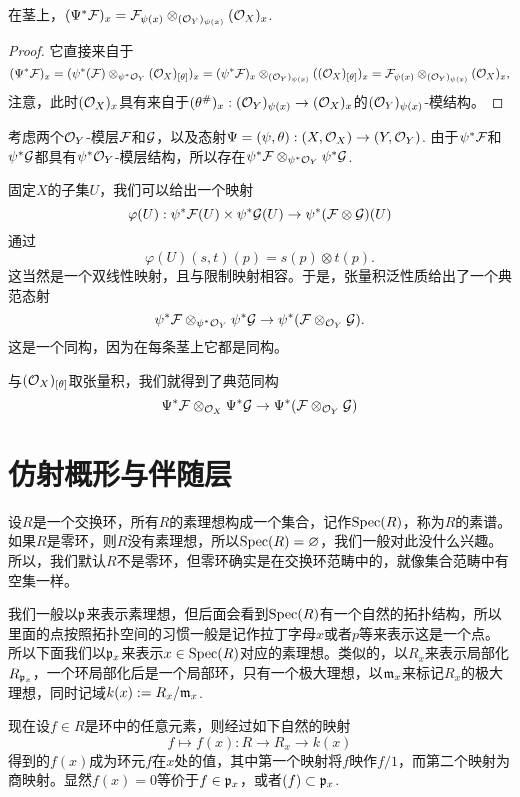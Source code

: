 \begin{pro}
在茎上，$(\Psi^*\mathcal{F})_x=\mathcal{F}_{\psi(x)}\otimes_{(\mathcal{O}_Y)_{\psi(x)}} (\mathcal{O}_X)_{x}$.
\end{pro}

\begin{proof}
它直接来自于
\[
	(\Psi^*\mathcal{F})_x=(\psi^*(\mathcal{F})\otimes_{\psi^*\mathcal{O}_Y} (\mathcal{O}_X)_{[\theta]})_x=(\psi^*\mathcal{F})_x\otimes_{(\mathcal{O}_Y)_{\psi(x)}}((\mathcal{O}_X)_{[\theta]})_x=\mathcal{F}_{\psi(x)}\otimes_{(\mathcal{O}_Y)_{\psi(x)}}(\mathcal{O}_X)_x,
\]
注意，此时$(\mathcal{O}_X)_x$具有来自于$(\theta^\#)_x:(\mathcal{O}_Y)_{\psi(x)}\to (\mathcal{O}_X)_x$的$(\mathcal{O}_Y)_{\psi(x)}$-模结构。
\end{proof}

\begin{para}[张量积的逆像]
考虑两个$\mathcal{O}_Y$-模层$\mathcal{F}$和$\mathcal{G}$，以及态射$\Psi=(\psi,\theta):(X,\mathcal{O}_X)\to (Y,\mathcal{O}_Y)$. 由于$\psi^*\mathcal{F}$和$\psi^*\mathcal{G}$都具有$\psi^*\mathcal{O}_Y$-模层结构，所以存在$\psi^*\mathcal{F}\otimes_{\psi^*\mathcal{O}_Y}\psi^*\mathcal{G}$.

固定$X$的子集$U$，我们可以给出一个映射
\[
	\varphi(U):\psi^*\mathcal{F}(U)\times \psi^*\mathcal{G}(U) \to \psi^*(\mathcal{F}\otimes \mathcal{G})(U)
\]
通过
\[
	\varphi(U)(s,t)(p)=s(p)\otimes t(p).
\]
这当然是一个双线性映射，且与限制映射相容。于是，张量积泛性质给出了一个典范态射
\[
	\psi^*\mathcal{F}\otimes_{\psi^*\mathcal{O}_Y} \psi^*\mathcal{G} \to \psi^*(\mathcal{F}\otimes_{\mathcal{O}_Y} \mathcal{G}).
\]
这是一个同构，因为在每条茎上它都是同构。

与$(\mathcal{O}_X)_{[\theta]}$取张量积，我们就得到了典范同构
\[
	\Psi^*\mathcal{F}\otimes_{\mathcal{O}_X} \Psi^*\mathcal{G} \to \Psi^*(\mathcal{F}\otimes_{\mathcal{O}_Y} \mathcal{G})
\]
\end{para}

\section{仿射概形与伴随层}

\para 设$R$是一个交换环，所有$R$的素理想构成一个集合，记作$\operatorname{Spec}(R)$，称为$R$的素谱。如果$R$是零环，则$R$没有素理想，所以$\operatorname{Spec}(R)=\varnothing$，我们一般对此没什么兴趣。所以，我们默认$R$不是零环，但零环确实是在交换环范畴中的，就像集合范畴中有空集一样。

我们一般以$\mathfrak{p}$来表示素理想，但后面会看到$\operatorname{Spec}(R)$有一个自然的拓扑结构，所以里面的点按照拓扑空间的习惯一般是记作拉丁字母$x$或者$p$等来表示这是一个点。所以下面我们以$\mathfrak{p}_x$来表示$x\in \operatorname{Spec}(R)$对应的素理想。类似的，以$R_x$来表示局部化$R_{\mathfrak{p}_x}$，一个环局部化后是一个局部环，只有一个极大理想，以$\mathfrak{m}_x$来标记$R_x$的极大理想，同时记域$k(x):=R_x/\mathfrak{m}_x$.

\para 现在设$f\in R$是环中的任意元素，则经过如下自然的映射
\[
	f\mapsto f(x):R\to R_x\to k(x)
\]
得到的$f(x)$成为环元$f$在$x$处的值，其中第一个映射将$f$映作$f/1$，而第二个映射为商映射。显然$f(x)=0$等价于$f\in \mathfrak{p}_x$，或者$(f)\subset \mathfrak{p}_x$.


